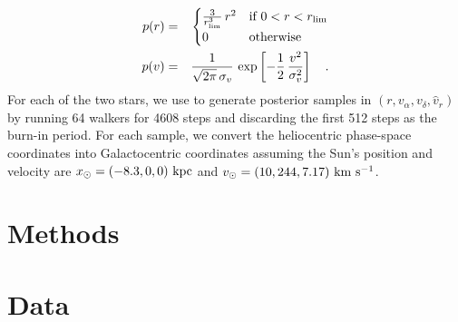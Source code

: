 \documentclass[12pt,letterpaper]{article}
\begin{document}
\begin{eqnarray}
p(r) &=&
  \begin{cases}
    \frac{3}{r_{\rm lim}^3} \, r^2 & \text{if } 0 < r < r_{\rm lim}\\
    0              & \text{otherwise}
  \end{cases}\\
p(v) &=& \frac{1}{\sqrt{2\pi}\,\sigma_v} \,
  \exp\left[-\frac{1}{2} \, \frac{v^2}{\sigma_v^2} \right] \quad .
\end{eqnarray}
For each of the two stars, we use 
to generate posterior samples in $(r, v_\alpha,
v_\delta, \hat{v}_r)$ by running 64 walkers for 4608 steps and discarding the
first 512 steps as the burn-in period.
For each sample, we convert the heliocentric phase-space coordinates into
Galactocentric coordinates assuming the Sun's position and velocity are $x_\odot
= (-8.3, 0, 0)~{\rm kpc}$ and $v_\odot = (10, 244, 7.17)~\mathrm{km}~\mathrm{s}^{-1}$.

\section{Methods}
\label{sec:methods}

\section{Data}
\label{sec:data}

%
\end{document}
